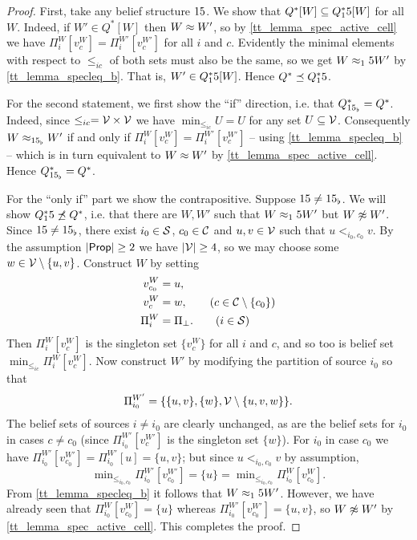 \begin{proof}
    First, take any belief structure $15$. We show that $Q^*[W] \subseteq
    Q^*_15[W]$ for all $W$. Indeed, if $W' \in Q^*[W]$ then $W \approx W'$, so
    by \cref{tt_lemma_spec_active_cell} we have $\Pi^W_i[v^W_c] =
    \Pi^{W'}_i[v^{W'}_c]$ for all $i$ and $c$. Evidently the minimal elements
    with respect to $\le_{ic}$ of both sets must also be the same, so we get $W
    \approx_15 W'$ by \cref{tt_lemma_specleq_b}. That is, $W' \in Q^*_15[W]$.
    Hence $Q^* \preceq Q^*_15$.

    For the second statement, we first show the ``if'' direction, i.e. that
    $Q^*_{15_\flat} = Q^*$. Indeed, since $\le_{ic} = \mathcal{V} \times \mathcal{V}$ we
    have $\min_{\le_{ic}}{U} = U$ for any set $U \subseteq \mathcal{V}$. Consequently
    $W \approx_{15_\flat} W'$ if and only if $\Pi^W_i[v^W_c] =
    \Pi^{W'}_i[v^{W'}_c]$ -- using \cref{tt_lemma_specleq_b} -- which is in
    turn equivalent to $W \approx W'$ by \cref{tt_lemma_spec_active_cell}.
    Hence $Q^*_{15_\flat} = Q^*$.

    For the ``only if'' part we show the contrapositive. Suppose $15 \ne
    15_\flat$. We will show $Q^*_15 \not\preceq Q^*$, i.e. that there are $W,
    W'$ such that $W \approx_15 W'$ but $W \not\approx W'$. Since $15 \ne
    15_\flat$, there exist $i_0 \in \mathcal{S}$, $c_0 \in \mathcal{C}$ and $u, v \in \mathcal{V}$
    such that $u <_{i_0,c_0} v$. By the assumption $|\mathsf{Prop}| \ge 2$ we have
    $|\mathcal{V}| \ge 4$, so we may choose some $w \in \mathcal{V} \setminus \{u, v\}$.
    Construct $W$ by setting
    \begin{align*}
        v^W_{c_0} &= u, \\
        v^W_c &= w, \qquad (c \in \mathcal{C} \setminus \{c_0\}) \\
        \Pi^W_i &= \Pi_\bot. \qquad (i \in \mathcal{S})
    \end{align*}
    Then $\Pi^W_i[v^W_c]$ is the singleton set $\{v^W_c\}$ for all $i$ and
    $c$, and so too is belief set $\min_{\le_{ic}}{\Pi^W_i[v^W_c]}$.
    Now construct $W'$ by modifying the partition of source $i_0$ so that
    \[
        \Pi^{W'}_{i_0} = \{\{u, v\}, \{w\}, \mathcal{V} \setminus \{u, v, w\}\}.
    \]
    The belief sets of sources $i \ne i_0$ are clearly unchanged, as are the
    belief sets for $i_0$ in cases $c \ne c_0$ (since
    $\Pi^{W'}_{i_0}[v^{W'}_c]$ is the singleton set $\{w\}$). For $i_0$ in case
    $c_0$ we
    have $\Pi^{W'}_{i_0}[v^{W'}_{c_0}] = \Pi^{W'}_{i_0}[u] = \{u, v\}$; but
    since $u <_{i_0,c_0} v$ by assumption,
    \[
        \min\nolimits_{\le_{i_0,c_0}}{\Pi^{W'}_{i_0}[v^{W'}_{c_0}]}
        = \{u\}
        = \min\nolimits_{\le_{i_0,c_0}}{\Pi^{W}_{i_0}[v^{W}_{c_0}]}.
    \]
    From \cref{tt_lemma_specleq_b} it follows that $W \approx_15 W'$. However,
    we have already seen that $\Pi^W_{i_0}[v^W_{c_0}] = \{u\}$ whereas
    $\Pi^{W'}_{i_0}[v^{W'}_{c_0}] = \{u, v\}$, so $W \not\approx W'$ by
    \cref{tt_lemma_spec_active_cell}. This completes the proof.
\end{proof}

